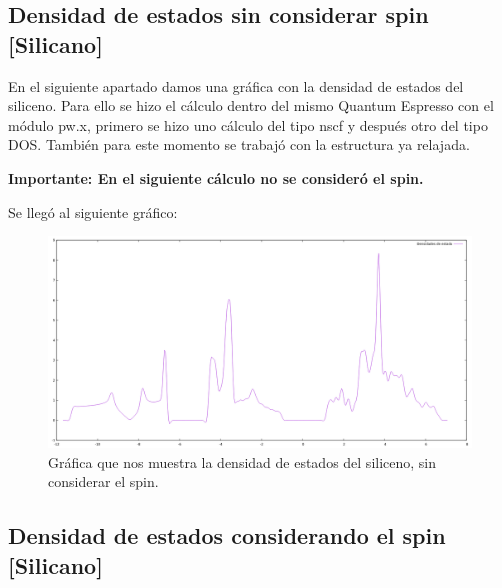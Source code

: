 
\newpage

\subsection{Densidad de estados sin considerar spin [Silicano]}

En el siguiente apartado damos una gráfica con la densidad de estados del siliceno. Para 
ello se hizo el cálculo dentro del mismo Quantum Espresso con el módulo pw.x, primero se hizo uno cálculo 
del tipo nscf y después otro del tipo DOS. También para este momento se trabajó con la estructura
ya relajada.

\vspace{0.5cm}

\textbf{Importante: En el siguiente cálculo no se consideró el spin.}

\vspace{0.5cm}

\vspace{0.5cm}

Se llegó al siguiente gráfico:

\begin{figure}[H]
    \centering
    \includegraphics[scale=0.38]{images_silicano/Densidades_estado_sin_spin.png}
    \caption{Gráfica que nos muestra la densidad de estados del siliceno, sin considerar el spin.}
\end{figure}


\newpage

\subsection{Densidad de estados considerando el spin [Silicano]}

